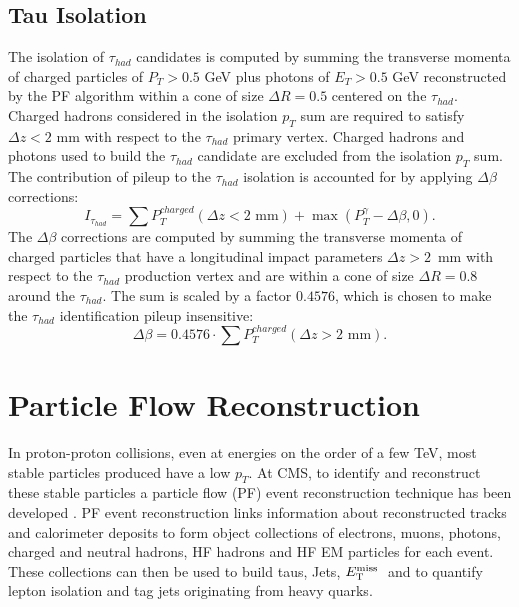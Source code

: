 \subsection{Tau Isolation}
The isolation of $\tau_{had}$ candidates is computed
by summing the transverse momenta of charged particles 
of $P_{T} > 0.5$ GeV plus photons of $E_{T} > 0.5$ GeV 
reconstructed by the PF algorithm
within a cone of size $\Delta R = 0.5$ centered on the $\tau_{had}$.
Charged hadrons considered in the isolation $p_{T}$ sum 
are required to satisfy $\Delta z < 2$ mm with respect to the 
$\tau_{had}$ primary vertex.
Charged hadrons and photons used to build the $\tau_{had}$ candidate 
are excluded from the isolation $p_{T}$ sum.
The contribution of pileup to the $\tau_{had}$ isolation 
is accounted for by applying $\Delta \beta$ corrections:
\begin{equation*}
I_{\tau_{had}} = \sum P_{T}^{charged} (\Delta z < 2\mbox{~mm}) + \max \left( P_{T}^{\gamma} - \Delta \beta, 0 \right).
\end{equation*}
The $\Delta \beta$ corrections are computed by summing the transverse
momenta of charged particles that have a longitudinal impact 
parameters $\Delta z > 2$~mm with respect to the 
$\tau_{had}$ production vertex
and are within a cone of size $\Delta R = 0.8$ around the $\tau_{had}$.
The sum is scaled by a factor $0.4576$, which is chosen to 
make the $\tau_{had}$ identification pileup insensitive:
\begin{equation*}
\Delta \beta = 0.4576 \cdot \sum P_{T}^{charged} (\Delta z > 2\mbox{~mm}).
\end{equation*}

\section{Particle Flow Reconstruction}
In proton-proton collisions, even at energies on the order of a few TeV, 
most stable particles produced have a low $p_{T}$.
At CMS, to identify and reconstruct these stable particles a particle flow (PF) event 
reconstruction technique has been developed \cite{PFT09001}\cite{PFT10003}. 
PF event reconstruction links 
information %
about reconstructed tracks and calorimeter deposits
to form object collections of 
electrons, muons, photons, charged and neutral hadrons, HF hadrons and HF EM particles
for each event. These collections can then be used to build taus, Jets, $E_\mathrm{T}^{\mathrm{miss}}\;$
and to quantify lepton isolation and tag jets originating from heavy quarks.


